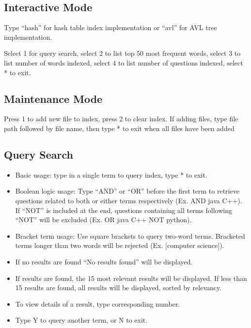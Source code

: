 \documentclass{article}
\begin{document}
\subsection{Interactive Mode}

Type “hash” for hash table index implementation or “avl” for AVL tree implementation.

Select 1 for query search, select 2 to list top 50 most frequent words, select 3 to list number of words indexed, select 4 to list number of questions indexed, select * to exit.

\subsection{Maintenance Mode}

Press 1 to add new file to index, press 2 to clear index. If adding files, type file path followed by file name, then type * to exit when all files have been added

\subsection{Query Search}

\begin{itemize}

\item Basic usage: type in a single term to query index, type * to exit.

\item Boolean logic usage: Type “AND” or “OR” before the first term to retrieve questions related to both or either terms respectively (Ex. AND java C++). If “NOT” is included at the end, questions containing all terms following “NOT” will be excluded (Ex. OR java C++ NOT python).

\item Bracket term usage: Use square brackets to query two-word terms. Bracketed terms longer than two words will be rejected (Ex. [computer science]).

\item If no results are found “No results found” will be displayed.

\item If results are found, the 15 most relevant results will be displayed. If less than 15 results are found, all results will be displayed, sorted by relevancy.

\item To view details of a result, type corresponding number.

\item Type Y to query another term, or N to exit.
  
\end{itemize}
\end{document}
